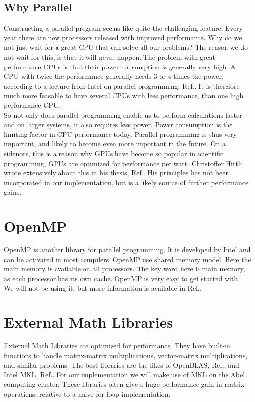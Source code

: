 \documentclass[a4paper,norsk,11pt,twoside]{report}
\begin{document}
\subsection{Why Parallel}
Constructing a parallel program seems like quite the challenging feature. Every year there are new processors released with improved performance. Why do we not just wait for a great CPU that can solve all our problems? The reason we do not wait for this, is that it will never happen. The problem with great performance CPUs is that their power consumption is generally very high. A CPU with twice the performance generally needs 3 or 4 times the power, according to a lecture from Intel on parallel programming, Ref.\cite{intelduden_citeation}. It is therefore much more feasable to have several CPUs with less performance, than one high performance CPU. \\

So not only does parallel programming enable us to perform calculations faster and on larger systems, it also requires less power. Power consumption is the limiting factor in CPU performance today. Parallel programming is thus very important, and likely to become even more important in the future. On a sidenote, this is a reason why GPUs have become so popular in scientific programming, GPUs are optimized for performance per watt. Christoffer Hirth wrote extensively about this in his thesis, Ref.\cite{non_refer_numba1}. His principles has not been incorporated in our implementation, but is a likely source of further performance gains.

\section{OpenMP}
OpenMP is another library for parallel programming. It is developed by Intel and can be activated in most compilers. OpenMP use shared memory model. Here the main memory is available on all processors. The key word here is main memory, as each processor has its own cache. OpenMP is very easy to get started with. We will not be using it, but more information is available in Ref.\cite{openmp_citation_po_g}.

\section{External Math Libraries}
External Math Libraries are optimized for performance. They have built-in functions to handle matrix-matrix multiplications, vector-matrix multiplications, and similar problems. The best libraries are the likes of OpenBLAS, Ref.\cite{openblas_citation}, and Intel MKL, Ref.\cite{mkl_citation}. For our implementation we will make use of MKL on the Abel computing cluster. These libraries often give a huge performance gain in matrix operations, relative to a naive for-loop implementation. \\
\end{document}
